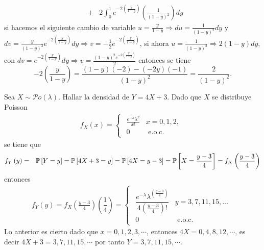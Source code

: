 \begin{Ejem}
\begin{eqnarray*}
&+& 2 \int_{0}^{1} e^{-2\left(\frac{y}{1-y}\right)}\left(\frac{1}{\left(1-y\right)^{2}}\right) dy
\end{eqnarray*}
si hacemos el siguiente cambio de variable
$u=\frac{y}{1-y}\Rightarrow du=\frac{1}{\left(1-y\right)^{2}} dy$ y $dv= \frac{y}{\left(1-y\right)^3}e^{-2\left(\frac{y}{1-y}\right)} dy \Rightarrow v=-\frac{1}{2}e^{-2\left(\frac{y}{1-y}\right)}$, si ahora
$u=\frac{1}{\left(1-y\right)^{2}} \Rightarrow 2\left(1-y\right)dy$, con $dv= e^{-2\left(\frac{y}{1-y}\right)} dy \Rightarrow v= \frac{\left(1-y\right)^2 e^{-2\left(\frac{y}{1-y}\right)}}{2}$ entonces se tiene
$$-2\left(\frac{y}{1-y}\right)=\frac{\left(1-y\right)\left(-2\right)-\left(-2y\right)\left(-1\right)}{\left(1-y\right)^2}= \frac{2}{\left(1-y\right)^2}.$$
\end{Ejem}

\begin{Ejem}
Sea $X \sim \mathcal{P}o\left(\lambda\right)$. Hallar la densidad de $Y=4X+3$. Dado que $X$ se distribuye Poisson
\begin{eqnarray*}
f_{X}\left(x\right)=
\begin{cases}
\begin{array}{lc}
\frac{e^{-\lambda}\lambda^{x}}{x!} & x=0,1,2,\\
0 & \textrm{ e.o.c.}
\end{array}
\end{cases}
\end{eqnarray*}
se tiene que
\begin{eqnarray*}
f_{Y}\left(y\right)&=& \mathbb{P}\left[Y=y\right]= \mathbb{P}\left[4X+3=y\right]=\mathbb{P}\left[4X=y-3\right]=\mathbb{P}\left[X=\frac{y-3}{4}\right]=f_{X}\left(\frac{y-3}{4}\right)\end{eqnarray*}entonces
\begin{eqnarray*}
f_{Y}\left(y\right)=f_{X}\left(\frac{y-3}{4}\right)\left(\dfrac{1}{4}\right)= 
\begin{cases}
\begin{array}{lc}
\dfrac{e^{-\lambda} \lambda^{\left(\frac{y-3}{4}\right)}}{4\left(\frac{y-3}{4}\right)!} & y=3,7,11,15,\ldots\\
0 & \textrm{ e.o.c.}
\end{array}
\end{cases}
\end{eqnarray*}
Lo anterior es cierto dado que 
$x=0,1,2,3,\cdots$, entonces $4X=0,4,8,12, \cdots$, es decir
$4X+3=3,7,11,15, \cdots$ por tanto $Y=3,7,11,15, \cdots$. 
\end{Ejem}


